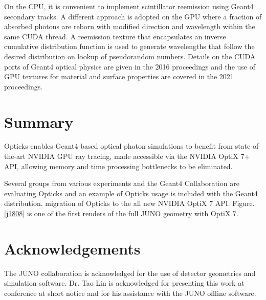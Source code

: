 \documentclass{webofc}
\begin{document}
%
On the CPU, it is convenient to implement scintillator reemission using Geant4 secondary 
tracks. A different approach is adopted on the GPU where a fraction of absorbed photons
are reborn with modified direction and wavelength within the same CUDA thread. 
A reemission texture that encapsulates an inverse cumulative distribution function 
is used to generate wavelengths that follow the desired distribution on lookup of pseudorandom numbers. 
%
Details on the CUDA ports of Geant4 optical physics are given in the 2016 proceedings\cite{chep2016}
and the use of GPU textures for material and surface properties are covered in the 2021 
proceedings\cite{chep2021}. 
%
%
%
\section{Summary}
%
Opticks enables Geant4-based optical photon simulations to benefit from 
state-of-the-art NVIDIA GPU ray tracing, made accessible via the NVIDIA OptiX 7+ API,
allowing memory and time processing bottlenecks to be eliminated.

Several groups from various experiments and the Geant4 Collaboration are evaluating Opticks
and an example of Opticks usage is included with the Geant4 distribution. 
migration of Opticks to the all new NVIDIA OptiX 7 API. 
Figure.\ref{j1808} is one of the first renders of the full JUNO geometry with OptiX 7.
%
%
\newpage
\section*{Acknowledgements}
%
The JUNO collaboration is acknowledged for the use of detector 
geometries and simulation software. Dr. Tao Lin is acknowledged for presenting 
this work at conference at short notice and for his assistance with 
the JUNO offline software.
\end{document}
